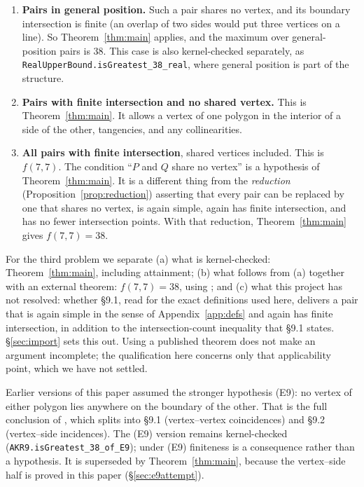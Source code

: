 \documentclass[11pt,a4paper]{article}
\theoremstyle{plain}
\theoremstyle{definition}
\theoremstyle{remark}
\begin{document}
\begin{enumerate}[leftmargin=*]
  \item \textbf{Pairs in general position.} Such a pair shares no vertex, and
    its boundary intersection is finite (an overlap of two sides would put
    three vertices on a line). So Theorem~\ref{thm:main} applies, and the
    maximum over general-position pairs is $38$. This case is also
    kernel-checked separately, as \texttt{RealUpperBound.isGreatest\_38\_real},
    where general position is part of the structure.
  \item \textbf{Pairs with finite intersection and no shared vertex.} This is
    Theorem~\ref{thm:main}. It allows a vertex of one polygon in the interior of
    a side of the other, tangencies, and any collinearities.
  \item \textbf{All pairs with finite intersection}, shared vertices included.
    This is $f(7,7)$. The condition ``$P$ and $Q$ share no vertex'' is a
    hypothesis of Theorem~\ref{thm:main}. It is a different thing from the
    \emph{reduction} (Proposition~\ref{prop:reduction}) asserting that every
    pair can be replaced by one that shares no vertex, is again simple, again
    has finite intersection, and has no fewer intersection points. With that
    reduction, Theorem~\ref{thm:main} gives $f(7,7)=38$.
\end{enumerate}

For the third problem we separate (a) what is kernel-checked:
Theorem~\ref{thm:main}, including attainment; (b) what follows from (a)
together with an external theorem: $f(7,7)=38$, using
\cite[\S9.1]{AckermanKeszeghRote2022}; and (c) what this project has not
resolved: whether \S9.1, read for the exact definitions used here, delivers a
pair that is again simple in the sense of Appendix~\ref{app:defs} and again has
finite intersection, in addition to the intersection-count inequality that
\S9.1 states. \S\ref{sec:import} sets this out. Using a published theorem does
not make an argument incomplete; the qualification here concerns only that
applicability point, which we have not settled.

Earlier versions of this paper assumed the stronger hypothesis (E9): no vertex
of either polygon lies anywhere on the boundary of the other. That is the full
conclusion of \cite[\S9]{AckermanKeszeghRote2022}, which splits into \S9.1
(vertex--vertex coincidences) and \S9.2 (vertex--side incidences). The (E9)
version remains kernel-checked (\texttt{AKR9.isGreatest\_38\_of\_E9}); under
(E9) finiteness is a consequence rather than a hypothesis. It is superseded by
Theorem~\ref{thm:main}, because the vertex--side half is proved in this paper
(\S\ref{sec:e9attempt}).
\end{document}
